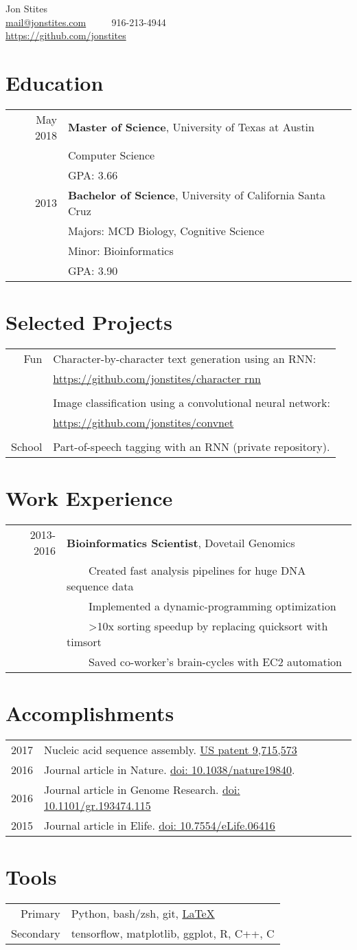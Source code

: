 \documentclass[12pt]{extarticle}
\makeatletter
\newcommand{\tabitem}{~~\llap{\textbullet}~~}
\newcommand*{\email}{
	\href{mailto:mail+resume@jonstites.com }{mail@jonstites.com}
	}
\newcommand*{\phone}{
	916-213-4944
	}
\newcommand*{\github}{
	{\href{https://github.com/jonstites}{https://github.com/jonstites}}
}
\newcommand*{\charrnn}{
	Character-by-character text generation using an RNN: \\
	& {\href{https://github.com/jonstites/character_rnn}{https://github.com/jonstites/character \textunderscore rnn}}
}
\newcommand*{\convnet}{
	Image classification using a convolutional neural network: \\
	& {\href{https://github.com/jonstites/convnet}{https://github.com/jonstites/convnet}}
}
\newcommand*{\postagging}{
	Part-of-speech tagging with an RNN (private repository).
}
\newcommand*{\Contact}{
	\begin{center}
		\Huge Jon Stites \\
	    \small \email \tabitem \phone \\
	    \github \\
	\end{center}
}
\newcommand*{\Education}{
	\section{Education}
	\begin{tabular}{rl}
		May 2018  & \textbf{Master of Science}, University of Texas at Austin \\
				  & Computer Science \\
          		  & GPA: 3.66 \\
		2013 	  & \textbf{Bachelor of Science}, University of California Santa Cruz \\
				  & Majors: MCD Biology, Cognitive Science \\
		  		  & Minor: Bioinformatics \\
				  & GPA: 3.90 \\
\end{tabular}
}
\newcommand*{\Projects}{
	\section{Selected Projects}
	\begin{tabular}{rl}
	Fun & \charrnn \\ \\
		& \convnet \\ \\
	School & \postagging \\
	\end{tabular}
}
\newcommand*{\Tools}{
	\section{Tools}
	\begin{tabular}{rl}
	Primary   & Python, bash/zsh, git, 
			  \href{http://stevehanov.ca/blog/resume_comic.png}{\LaTeX} \\
	Secondary & tensorflow, matplotlib, ggplot, R, C++, C \\
	\end{tabular}
}
\newcommand*{\Work}{
	\section{Work Experience}
	\begin{tabular}{rl}
	2013-2016 & \textbf{Bioinformatics Scientist}, 
			    Dovetail Genomics \\
	   & \tabitem Created fast analysis pipelines for huge DNA sequence data \\
	   & \tabitem Implemented a dynamic-programming optimization \\
	   & \tabitem >10x sorting speedup by replacing quicksort with timsort \\
	   & \tabitem Saved co-worker's brain-cycles with EC2 automation \\

	\end{tabular}
}
\newcommand*{\Accomplishments}{
	\section{Accomplishments}
	\begin{tabular}{rl}
	2017 & Nucleic acid sequence assembly.
	\href{https://patents.google.com/patent/US9715573B2}
	{US patent 9,715,573} \\
	2016 & 
	Journal article in Nature.
	\href{https://www.ncbi.nlm.nih.gov/pubmed/27762356}
	{doi: 10.1038/nature19840}. \\
	2016 & 
	Journal article in Genome Research.
	\href{https://www.ncbi.nlm.nih.gov/pubmed/26848124}
	{doi: 10.1101/gr.193474.115} \\
	2015 & 
	Journal article in Elife.
	\href{https://www.ncbi.nlm.nih.gov/pubmed/25919952}
	{doi: 10.7554/eLife.06416}
	\end{tabular}
}
\makeatother
\begin{document}
\Contact
\Education
\Projects
\Work
\Accomplishments
\Tools
\end{document}
